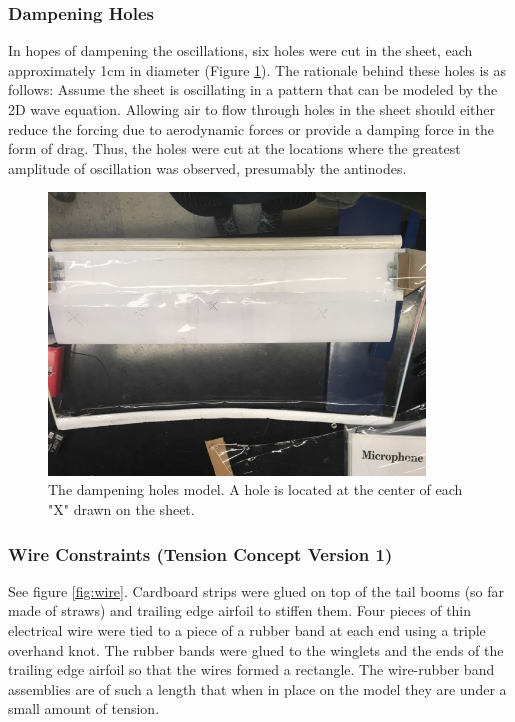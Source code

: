 \documentclass[12pt]{report} %
\begin{document}
\subsubsection{Dampening Holes}
In hopes of dampening the oscillations, six holes were cut in the sheet, each approximately 1cm in diameter (Figure \ref{fig:damp}).  The rationale behind these
holes is as follows:  Assume the sheet is oscillating in a pattern that can be modeled by the 2D wave equation.  Allowing air to flow
through holes in the sheet should either reduce the forcing due to aerodynamic forces or provide a damping force in the form of drag.
 Thus, the holes were cut at the locations where the greatest amplitude of oscillation was observed, presumably the antinodes.
\begin{figure}
\includegraphics[width = 10cm]{gb_simple_version.jpg}
\caption{The dampening holes model.  A hole is located at the center of each "X" drawn on the sheet.}
\label{fig:damp}
\end{figure}

\subsubsection{Wire Constraints (Tension Concept Version 1)}
See figure \ref{fig:wire}.  Cardboard strips were glued on top of the tail booms (so far made of straws) and trailing edge airfoil to
stiffen them.  Four pieces of
thin electrical wire were tied to a piece of a rubber band at each end using a triple overhand knot.  The rubber bands were glued
to the winglets and the ends of the trailing edge airfoil so that the wires formed a rectangle.  The wire-rubber band assemblies are
of such a length that when in place on the model they are under a small amount of tension.
\end{document}
